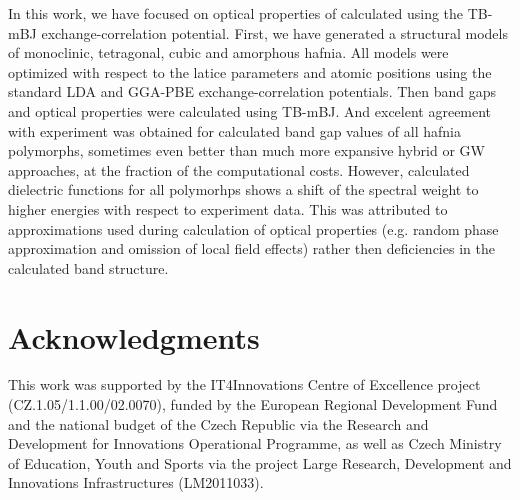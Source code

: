 \documentclass[10pt,a4paper,twocolumn]{article}
\begin{document}
In this work, we have focused on optical properties of  calculated using the TB-mBJ exchange-correlation potential. First, we have generated a structural models of monoclinic, tetragonal, cubic and amorphous hafnia.
All models were optimized with respect to the latice parameters and atomic positions using the standard LDA and GGA-PBE exchange-correlation potentials.
Then band gaps and optical properties were calculated using TB-mBJ.
And excelent agreement with experiment was obtained for calculated band gap values of all hafnia polymorphs, sometimes even better than much more expansive hybrid or GW approaches, at the fraction of the computational costs.
However, calculated dielectric functions for all polymorhps shows a shift of the spectral weight to higher energies with respect to experiment data.
This was attributed to approximations used during calculation of optical properties (e.g. random phase approximation and omission of local field effects) rather then deficiencies in the calculated band structure. 
  
\section*{Acknowledgments}
This work was supported by the IT4Innovations Centre of Excellence project (CZ.1.05/1.1.00/02.0070), funded by the European Regional Development Fund and the national budget of the Czech Republic via the Research and Development for Innovations Operational Programme, as well as Czech Ministry of Education, Youth and Sports via the project Large Research, Development and Innovations Infrastructures (LM2011033).



\end{document}
